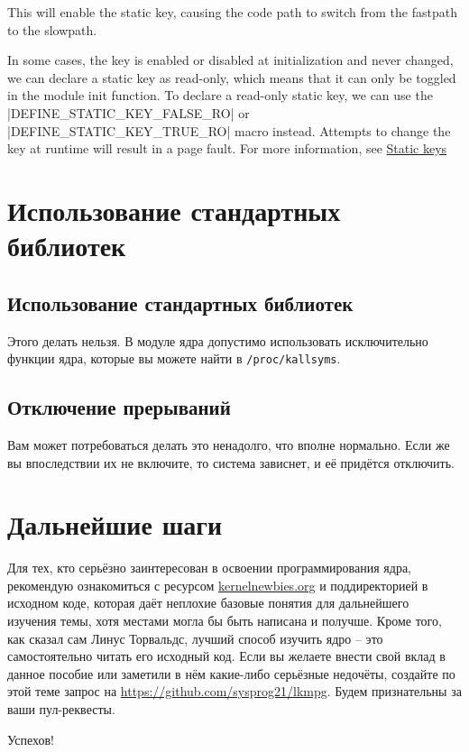 \documentclass[10pt, oneside]{book}
\begin{document}
This will enable the static key, causing the code path to switch from the fastpath to the slowpath.

In some cases, the key is enabled or disabled at initialization and never changed, we can declare a static key as read-only, which means that it can only be toggled in the module init function. To declare a read-only static key, we can use the \cpp|DEFINE_STATIC_KEY_FALSE_RO| or \cpp|DEFINE_STATIC_KEY_TRUE_RO| macro instead. Attempts to change the key at runtime will result in a page fault.
For more information, see \href{https://www.kernel.org/doc/Documentation/static-keys.txt}{Static keys}

\section{Использование стандартных библиотек}
\label{sec:opitfall}

\subsection{Использование стандартных библиотек}
\label{sec:using_stdlib}
Этого делать нельзя. В модуле ядра допустимо использовать исключительно функции ядра, которые вы можете найти в \verb|/proc/kallsyms|.

\subsection{Отключение прерываний}
\label{sec:disabling_interrupts}
Вам может потребоваться делать это ненадолго, что вполне нормально. Если же вы впоследствии их не включите, то система зависнет, и её придётся отключить.

\section{Дальнейшие шаги}
\label{sec:where_to_go}
Для тех, кто серьёзно заинтересован в освоении программирования ядра, рекомендую ознакомиться с ресурсом \href{https://kernelnewbies.org}{kernelnewbies.org} и поддиректорией  в исходном коде, которая даёт неплохие базовые понятия для дальнейшего изучения темы, хотя
местами могла бы быть написана и получше. Кроме того, как сказал сам Линус Торвальдс, лучший способ изучить ядро – это самостоятельно читать его исходный код.
Если вы желаете внести свой вклад в данное пособие или заметили в нём какие-либо серьёзные недочёты, создайте по этой теме запрос на \url{https://github.com/sysprog21/lkmpg}.
Будем признательны за ваши пул-реквесты.

Успехов!
\end{document}
